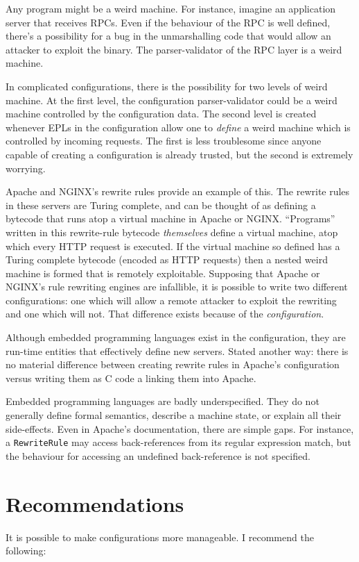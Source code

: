 \documentclass[letterpaper,twocolumn,10pt]{article}
\begin{document}
Any program might be a weird machine. For instance, imagine an application server that receives RPCs. Even if the behaviour of the RPC is well defined, there's a possibility for a bug in the unmarshalling code that would allow an attacker to exploit the binary. The parser-validator of the RPC layer is a weird machine.

In complicated configurations, there is the possibility for two levels of weird machine. At the first level, the configuration parser-validator could be a weird machine controlled by the configuration data. The second level is created whenever EPLs in the configuration allow one to \emph{define} a weird machine which is controlled by incoming requests. The first is less troublesome since anyone capable of creating a configuration is already trusted, but the second is extremely worrying.

Apache and NGINX's rewrite rules provide an example of this. The rewrite rules in these servers are Turing complete, and can be thought of as defining a bytecode that runs atop a virtual machine in Apache or NGINX. ``Programs'' written in this rewrite-rule bytecode \emph{themselves} define a virtual machine, atop which every HTTP request is executed. If the virtual machine so defined has a Turing complete bytecode (encoded as HTTP requests) then a nested weird machine is formed that is remotely exploitable. Supposing that Apache or NGINX's rule rewriting engines are infallible, it is possible to write two different configurations: one which will allow a remote attacker to exploit the rewriting and one which will not. That difference exists because of the \emph{configuration}.

Although embedded programming languages exist in the configuration, they are run-time entities that effectively define new servers. Stated another way: there is no material difference between creating rewrite rules in Apache's configuration versus writing them as C code a linking them into Apache.

Embedded programming languages are badly underspecified. They do not generally define formal semantics, describe a machine state, or explain all their side-effects. Even in Apache's documentation, there are simple gaps. For instance, a \texttt{RewriteRule} may access back-references from its regular expression match, but the behaviour for accessing an undefined back-reference is not specified.


\section{Recommendations}
It is possible to make configurations more manageable. I recommend the following:
\end{document}
